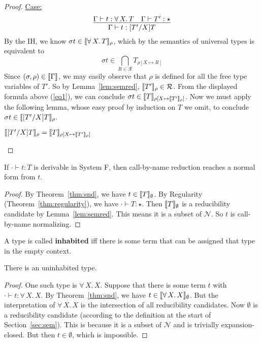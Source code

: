 \documentclass{article}
\begin{document}
\begin{proof}
\underline{Case:}
\[
\infer{\Gamma \vdash t : [T'/X]T}{\Gamma \vdash t : \forall\, X.\,T & \Gamma \vdash T' : \star}
\]
By the IH, we know $\sigma t\in\llbracket \forall\, X.\,T \rrbracket_\rho$, which by the semantics
of universal types is equivalent to
\begin{equation}
\label{eq1}
\sigma t \in \bigcap_{R\in\mathcal{R}} T_{\rho[X\mapsto R]}
\end{equation}
Since $(\sigma,\rho)\in\llbracket \Gamma \rrbracket$, we may easily observe that
$\rho$ is defined for all the free type variables of $T'$.  So by
Lemma~\ref{lem:semred}, $\llbracket T' \rrbracket_\rho\in\mathcal{R}$.  From the
displayed formula above (\ref{eq1}), we can conclude $\sigma t\in
\llbracket T \rrbracket_{\rho[X\mapsto \llbracket T' \rrbracket_\rho]}$.  Now we must apply the
following lemma, whose easy proof by induction on $T$ we omit, to
conclude $\sigma t\in\llbracket [T'/X]T \rrbracket_\rho$.
\begin{lemma}
$\llbracket [T'/X]T \rrbracket_\rho = \llbracket T \rrbracket_{\rho[X\mapsto \llbracket T' \rrbracket_\rho]}$
\end{lemma}
\vspace{-.3cm}
\end{proof}

\begin{corollary}
  If $\cdot\vdash t : T$ is derivable in System F, then call-by-name reduction
  reaches a normal form from $t$.
\end{corollary}
\begin{proof}
  By Theorem~\ref{thm:snd}, we have $t \in \llbracket T \rrbracket_\emptyset$.  By Regularity (Theorem~\ref{thm:regularity}),
  we have $\cdot\vdash T : \star$.  Then $\llbracket T \rrbracket_\emptyset$ is
  a reducibility candidate by Lemma~\ref{lem:semred}.  This means it is a subset of $\mathcal{N}$.  So $t$ is
  call-by-name normalizing.
\end{proof}

A type is called \textbf{inhabited} iff there is some term that can be assigned
that type in the empty context.

\vspace{0.25cm}
\begin{corollary}
  There is an uninhabited type.
\end{corollary}
\begin{proof}
  One such type is $\forall\,X.\,X$.  Suppose that there is some term $t$ with
  $\cdot\vdash t : \forall\,X.\,X$.  By Theorem~\ref{thm:snd}, we have $t \in \llbracket \forall\,X.\,X \rrbracket_\emptyset$.
  But the interpretation of $\forall\,X.\,X$ is the intersection of all reducibility candidates.
  Now $\emptyset$ is a reducibility candidate (according to the definition at the start of Section~\ref{sec:sem}).
  This is because it is a subset of $\mathcal{N}$ and is trivially expansion-closed.  But then $t\in\emptyset$,
  which is impossible.
  \end{proof}
\end{document}
